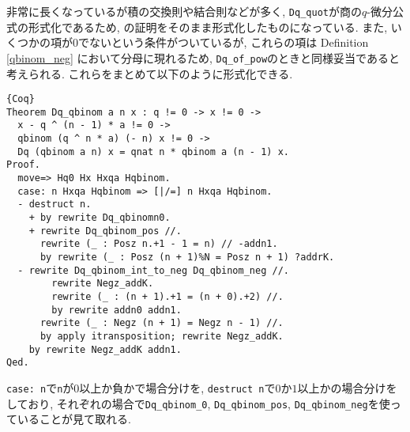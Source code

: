 \documentclass[11pt]{jarticle}
\theoremstyle{mystyle}
\newcommand{\0}{\textbf{0}}
\newcommand{\1}{\textbf{1}}
\newcommand{\2}{\textbf{2}}
\begin{document}
非常に長くなっているが積の交換則や結合則などが多く, {\tt Dq\_quot}が商の$q$-微分公式の形式化であるため, \cite{Kac}の証明をそのまま形式化したものになっている. また, いくつかの項が$0$でないという条件がついているが, これらの項は Definition \ref{qbinom_neg} において分母に現れるため, {\tt Dq\_of\_pow}のときと同様妥当であると考えられる. これらをまとめて以下のように形式化できる. 
\begin{lstlisting}{Coq}
Theorem Dq_qbinom a n x : q != 0 -> x != 0 ->
  x - q ^ (n - 1) * a != 0 ->
  qbinom (q ^ n * a) (- n) x != 0 ->
  Dq (qbinom a n) x = qnat n * qbinom a (n - 1) x.
Proof.
  move=> Hq0 Hx Hxqa Hqbinom.
  case: n Hxqa Hqbinom => [|/=] n Hxqa Hqbinom.
  - destruct n.
    + by rewrite Dq_qbinomn0.
    + rewrite Dq_qbinom_pos //.
      rewrite (_ : Posz n.+1 - 1 = n) // -addn1.
      by rewrite (_ : Posz (n + 1)%N = Posz n + 1) ?addrK.
  - rewrite Dq_qbinom_int_to_neg Dq_qbinom_neg //.
        rewrite Negz_addK.
        rewrite (_ : (n + 1).+1 = (n + 0).+2) //.
        by rewrite addn0 addn1.
      rewrite (_ : Negz (n + 1) = Negz n - 1) //.
      by apply itransposition; rewrite Negz_addK.
    by rewrite Negz_addK addn1.
Qed.
\end{lstlisting}
{\tt case:\,n}で{\tt n}が$0$以上か負かで場合分けを, {\tt destruct n}で$0$か$1$以上かの場合分けをしており, それぞれの場合で{\tt Dq\_qbinom\_0}, {\tt Dq\_qbinom\_pos}, {\tt Dq\_qbinom\_neg}を使っていることが見て取れる. 
\end{document}
